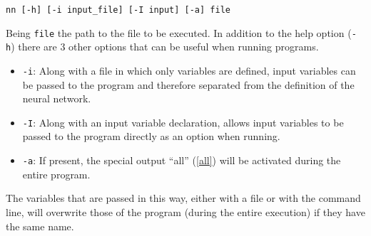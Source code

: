 \documentclass[a4paper]{article}
\begin{document}
\hspace{2cm} \texttt{nn [-h] [-i input\_file] [-I input] [-a] file}

Being \texttt{file} the path to the file to be executed.
In addition to the help option (\texttt{-h}) there are 3 other options that can be useful when running programs.
\begin{itemize}
\item \texttt{-i}: Along with a file in which only variables are defined, input variables can be passed to the program and therefore separated from the definition of the neural network.

\item \texttt{-I}: Along with an input variable declaration, allows input variables to be passed to the program directly as an option when running.

\item \texttt{-a}: If present, the special output ``all'' (\ref{all}) will be activated during the entire program.
\end{itemize}

The variables that are passed in this way, either with a file or with the command line, will overwrite those of the program (during the entire execution) if they have the same name.
\end{document}
